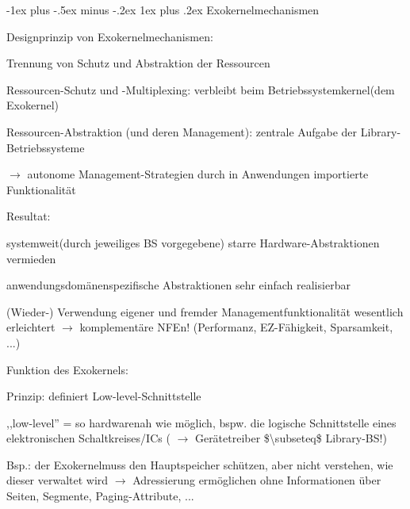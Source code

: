 \documentclass[a4paper]{article}
\makeatletter
\renewcommand{\subsubsection}{\@startsection{subsubsection}{3}{0mm}%
 {-1ex plus -.5ex minus -.2ex}%
 {1ex plus .2ex}%
 {\normalfont\small\bfseries}}
\makeatother
\begin{document}
\begin{multicols}{3}
    \subsubsection{Exokernelmechanismen}

    \begin{itemize*}
        \item
        Designprinzip von Exokernelmechanismen:
        \begin{itemize*}
            \item Trennung von Schutz und Abstraktion der Ressourcen
            \item Ressourcen-Schutz und -Multiplexing: verbleibt beim Betriebssystemkernel(dem Exokernel)
            \item Ressourcen-Abstraktion (und deren Management): zentrale Aufgabe der Library-Betriebssysteme \begin{itemize*} \item $\rightarrow$ autonome Management-Strategien durch in Anwendungen importierte Funktionalität \end{itemize*}
            \item Resultat: \begin{enumerate*} \item systemweit(durch jeweiliges BS vorgegebene) starre Hardware-Abstraktionen vermieden \item anwendungsdomänenspezifische Abstraktionen sehr einfach realisierbar \item (Wieder-) Verwendung eigener und fremder Managementfunktionalität wesentlich erleichtert $\rightarrow$ komplementäre NFEn! (Performanz, EZ-Fähigkeit, Sparsamkeit, ...) \end{enumerate*}
        \end{itemize*}
        \item
        Funktion des Exokernels:
        \begin{itemize*}
            \item Prinzip: definiert Low-level-Schnittstelle \begin{itemize*} \item ,,low-level'' = so hardwarenah wie möglich, bspw. die logische Schnittstelle eines elektronischen Schaltkreises/ICs ( $\rightarrow$ Gerätetreiber \$\textbackslash subseteq\$ Library-BS!) \item Bsp.: der Exokernelmuss den Hauptspeicher schützen, aber nicht verstehen, wie dieser verwaltet wird $\rightarrow$ Adressierung ermöglichen ohne Informationen über Seiten, Segmente, Paging-Attribute, ... \end{itemize*}

\end{itemize*}
\end{itemize*}
\end{multicols}
\end{document}
